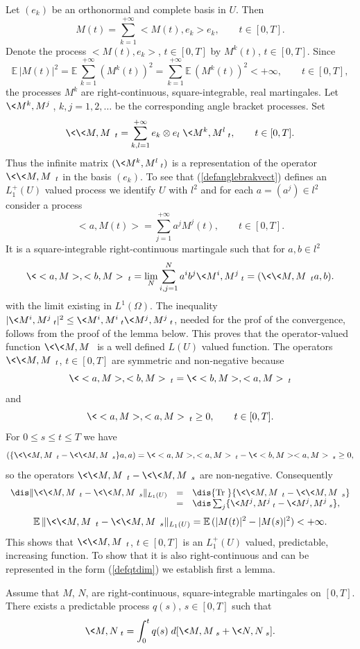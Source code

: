 \documentclass[preprint]{imsart}
\def\E{\mathbb E}
\begin{document}
{
Let $(e_k)$ be an orthonormal and complete basis in $U$. Then
$$
M(t)=\sum_{k=1}^{+\infty} <M(t),e_k>e_k,\qquad t\in [0,T].
$$
Denote the process
$<M(t),e_k>$, $t\in [0,T]$ by $M^k(t)$, $t\in [0,T]$. Since
$$
\E\, |M(t)|^2=\E\, \sum_{k=1}^{+\infty}
(M^k(t))^2
=\sum_{k=1}^{+\infty}\E\, (M^k(t))^2<+\infty
,\qquad t\in [0,T],
$$
the processes $M^k$ are right-continuous, square-integrable, real
martingales. Let $\<M^k,M^j\>$, $k,j=1,2,\ldots$ be the
corresponding angle bracket processes. Set
\begin{equation}\label{defanglebrakvect}
  \<\<M,M\>\>_t=\sum_{k,l=1}^{+\infty}e_k\otimes e_l
  \; \<M^k,M^l\>_t,\qquad t\in [0,T].
\end{equation}
Thus the infinite matrix $(\<M^k,M^l\>_t)$ is a representation of
the operator $\<\<M,M\>\>_t$ in the basis $(e_k)$.
To see that (\ref{defanglebrakvect}) defines an $L_1^+(U)$ valued
process we identify $U$ with $l^2$ and for each $a=(a^j)\in l^2$
consider a process
$$
<a,M(t)>=\sum_{j=1}^{+\infty} a^jM^j(t),\qquad t\in [0,T].
$$
It is a square-integrable right-continuous martingale such that
for $a,b\in l^2$
$$
\< <a,M>, <b,M>\>_t= \lim_N \sum_{i,j=1}^N a^ib^j \<M^i,M^j\>_t
= (\<\<M,M\>\>_ta,b).
$$
with  the limit existing in $L^1(\Omega)$. The inequality
$|\<M^i,M^j\>_t|^2\leq \<M^i,M^i\>_t\<M^j,M^j\>_t$, needed for the prof of the convergence, follows
from the proof of the lemma below.
This proves that the operator-valued function $\<\<M,M\>\>$ is a
well defined $L(U)$ valued function. The operators
$\<\<M,M\>\>_t$, $t\in [0,T]$ are symmetric and non-negative
because
$$
\<<a,M>, <b,M>\>_t=\< <b,M>, <a,M>\>_t
$$
and
$$
\< <a,M>, <a,M> \>_t\geq 0, \qquad t\in [0,T].
$$
For $0\leq s\leq t\leq T$ we have
$$
 (\{\<\<M,M\>\>_t-\<\<M,M\>\>_s\}a,a) =
\< <a,M>, <a,M> \>_t-\< <b, M> <a,M> \>_s\geq 0,
$$
so the operators $\<\<M,M\>\>_t-\<\<M,M\>\>_s$ are non-negative.
Consequently
$$\begin{array}{lll}\dis
\|\<\<M,M\>\>_t-\<\<M,M\>\>_s\|_{L_1(U)}
&=&\dis {\rm Tr\; }\{\<\<M,M\>\>_t-\<\<M,M\>\>_s\}\\
&
=&\dis\sum_j\{\<M^j,M^j\>_t-\<M^j,M^j\>_s\},
\end{array}
$$
$$
\E\, \|\<\<M,M\>\>_t-\<\<M,M\>\>_s\|_{L_1(U)}=
\E\, (|M(t)|^2 - |M(s)|^2 )<+\infty.
$$
This shows that $\<\<M,M\>\>_t$, $t\in [0,T]$ is an $L_1^+(U)$
valued, predictable, increasing function. To show that it is also
right-continuous and can be represented in the form
(\ref{defqtdim}) we establish first  a lemma.

\begin{Lemma}
  Assume that $M$, $N$, are right-continuous, square-integrable
  martingales on $[0,T]$. There exists a predictable process
  $q(s)$, $s\in [0,T]$ such that
  $$
  \<M,N\>_t=\int_0^tq(s)\; d[\<M,M\>_s+\<N,N\>_s].
  $$
\end{Lemma}

}
\end{document}
